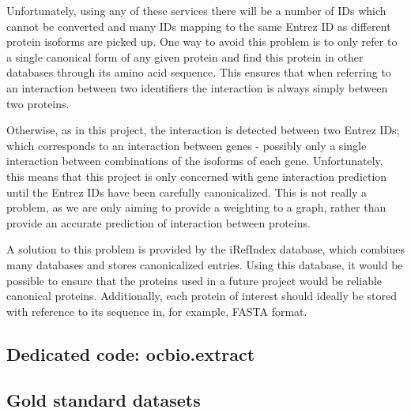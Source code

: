 \begin{itemize}
Unfortunately, using any of these services there will be a number of IDs which cannot be converted and many IDs mapping to the same Entrez ID as different protein isoforms are picked up.
One way to avoid this problem is to only refer to a single canonical form of any given protein and find this protein in other databases through its amino acid sequence.
This ensures that when referring to an interaction between two identifiers the interaction is always simply between two proteins.

Otherwise, as in this project, the interaction is detected between two Entrez IDs; which corresponds to an interaction between genes - possibly only a single interaction between combinations of the isoforms of each gene.
Unfortunately, this means that this project is only concerned with gene interaction prediction until the Entrez IDs have been carefully canonicalized.
This is not really a problem, as we are only aiming to provide a weighting to a graph, rather than provide an accurate prediction of interaction between proteins.

A solution to this problem is provided by the iRefIndex\cite{razick_irefindex_2008} database, which combines many databases and stores canonicalized entries.
Using this database, it would be possible to ensure that the proteins used in a future project would be reliable canonical proteins.
Additionally, each protein of interest should ideally be stored with reference to its sequence in, for example, FASTA format.

\subsection{Dedicated code: ocbio.extract}

\lipsum[15-20]


\subsection{Gold standard datasets}


\end{itemize}

